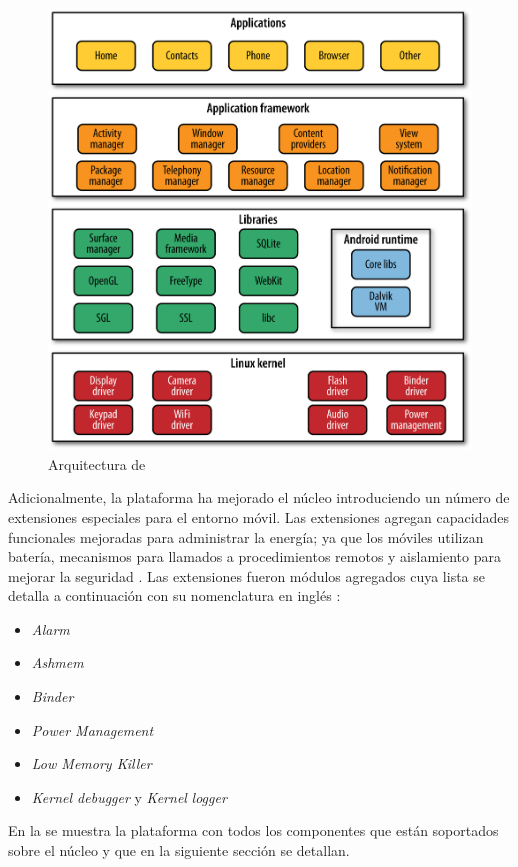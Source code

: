 \begin{figure}[H]
\begin{centering}
\includegraphics[width=0.8\columnwidth]{capitulo-5/graphics/android_stack}
\par\end{centering}
\caption[Arquitectura de Android]{\label{fig5:android-stack}Arquitectura de }
\end{figure}

Adicionalmente, la plataforma ha mejorado el núcleo introduciendo
un número de extensiones especiales para el entorno móvil. Las extensiones
agregan capacidades funcionales mejoradas para administrar la energía;
ya que los móviles utilizan batería, mecanismos para llamados a procedimientos
remotos y aislamiento para mejorar la seguridad \cite{Gargenta2014}.
Las extensiones fueron módulos agregados cuya lista se detalla a continuación
con su nomenclatura en inglés \cite{Schreiber2011}: 
\begin{itemize}
\item \emph{Alarm }
\item \emph{Ashmem}
\item \emph{Binder}
\item \emph{Power Management}
\item \emph{Low Memory Killer}
\item \emph{Kernel debugger} y \emph{Kernel} \emph{logger}
\end{itemize}
En la  se muestra la plataforma 
con todos los componentes que están soportados sobre el núcleo y que
en la siguiente sección se detallan.

